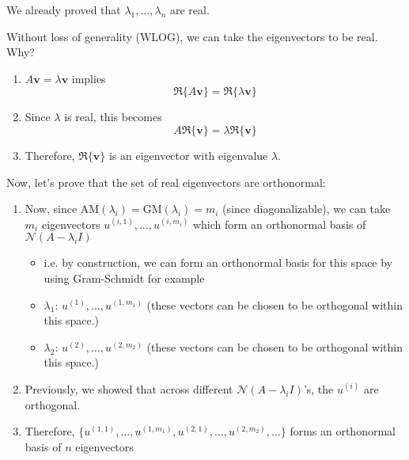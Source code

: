 \begin{derivation}
    We already proved that $\lambda_1, \dots, \lambda_n$ are real. 
    \vspace{1em}

    Without loss of generality (WLOG), we can take the eigenvectors to be real. Why?

    \begin{enumerate}
        \item $A\mathbf{v} = \lambda \mathbf{v}$ implies
        \[
        \Re \{A \mathbf{v} \} = \Re \{\lambda \mathbf{v} \}
        \]
        \item Since $\lambda$ is real, this becomes
        \[
        A \Re \{\mathbf{v} \} = \lambda \Re \{\mathbf{v} \}
        \]
        \item Therefore, $\Re \{\mathbf{v} \}$ is an eigenvector with eigenvalue $\lambda$.
    \end{enumerate}
    \vspace{1em}
    
    Now, let's prove that the set of real eigenvectors are orthonormal:

    \begin{enumerate}
        \item Now, since $\text{AM}(\lambda_i) = \text{GM}(\lambda_i) = m_i$ (since diagonalizable), we can take $m_i$ eigenvectors $u^{(i,1)}, \dots, u^{(i,m_i)}$ which form an orthonormal basis of $\mathcal{N}(A - \lambda_i I)$ 
        \begin{itemize}
            \item i.e. by construction, we can form an orthonormal basis for this space by using Gram-Schmidt for example
            \item $\lambda_1$: $u^{(1)},\ldots, u^{(1,m_1)}$ (these vectors can be chosen to be orthogonal within this space.)
            \item $\lambda_2$: $u^{(2)},\ldots, u^{(2,m_2)}$ (these vectors can be chosen to be orthogonal within this space.)
        \end{itemize}
        \item Previously, we showed that across different $\mathcal{N}(A - \lambda_i I)$'s, the $u^{(i)}$ are orthogonal. 
        \item Therefore, $\{u^{(1,1)}, \dots, u^{(1,m_1)}, u^{(2,1)}, \dots, u^{(2,m_2)}, \dots\}$ forms an orthonormal basis of $n$ eigenvectors
    \end{enumerate}
    \vspace{1em}


\end{derivation}

